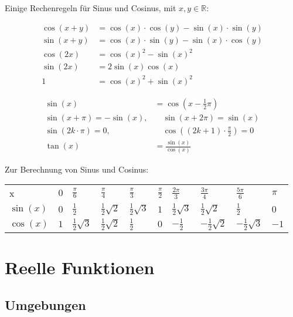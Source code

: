 \documentclass{panikzettel}
\newcommand{\R}{\mathbb{R}}
\begin{document}
Einige Rechenregeln für Sinus und Cosinus, mit $x,y \in \R$: \\
\begin{halfboxl}
  \vspace{-\baselineskip}
  \begin{align*}
    \cos(x+y) &= \cos(x) \cdot \cos(y) - \sin(x) \cdot \sin(y) \\
    \sin(x+y) &= \cos(x) \cdot \sin(y) - \sin(x) \cdot \cos(y) \\
    \cos(2x) &= \cos(x)^2 - \sin(x)^2 \\
    \sin(2x) &= 2 \sin(x) \cos(x) \\
    1 &= \cos(x)^2 + \sin(x)^2
  \end{align*}
\end{halfboxl}%
\begin{halfboxr}
  \vspace{-\baselineskip}
  \begin{align*}
    \sin(x) &= \cos(x - \frac{1}{2} \pi) \\
    \sin(x + \pi) = -\sin(x), & \quad \sin(x + 2 \pi) = \sin(x) \\
    \sin(2k \cdot \pi) = 0, & \quad \cos((2k+1) \cdot \frac{\pi}{2}) = 0 \\
    \tan(x) &= \frac{\sin(x)}{\cos(x)}
  \end{align*}
\end{halfboxr}

Zur Berechnung von Sinus und Cosinus:

{\setlength{\extrarowheight}{10pt}
\begin{tabularx}{\textwidth}{Y|Y|Y|Y|Y|Y|Y|Y|Y|Y}
  x & $0$ & $\frac{\pi}{6}$ & $\frac{\pi}{4}$ & $\frac{\pi}{3}$ & $\frac{\pi}{2}$ & $\frac{2\pi}{3}$ & $\frac{3\pi}{4}$ & $\frac{5\pi}{6}$ & $\pi$ \\
  $\sin(x)$ & $0$ & $\frac{1}{2}$ & $\frac{1}{2} \sqrt{2}$ & $\frac{1}{2} \sqrt{3}$ & $1$ & $\frac{1}{2} \sqrt{3}$ & $\frac{1}{2} \sqrt{2}$ & $\frac{1}{2}$ & $0$ \\
  $\cos(x)$ & $1$ & $\frac{1}{2} \sqrt{3}$ & $\frac{1}{2} \sqrt{2}$ & $\frac{1}{2}$ & $0$ & $-\frac{1}{2}$ & $-\frac{1}{2} \sqrt{2}$ & $-\frac{1}{2} \sqrt{3}$ & $-1$
\end{tabularx}}
\medskip

\section{Reelle Funktionen}

\subsection{Umgebungen}
\end{document}
